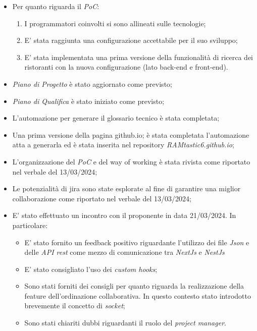 \begin{itemize}
    \item Per quanto riguarda il \emph{PoC}:
    \begin{enumerate}
        \item I programmatori coinvolti si sono allineati sulle tecnologie;
        \item E' stata raggiunta una configurazione accettabile per il suo sviluppo;
        \item E' stata implementata una prima versione della funzionalità di ricerca dei ristoranti con la nuova configurazione (lato back-end e front-end).
    \end{enumerate}
    \item \emph{Piano di Progetto} è stato aggiornato come previsto;
    \item \emph{Piano di Qualifica} è stato iniziato come previsto;
    \item L'automazione per generare il glossario tecnico è stata completata;
    \item Una prima versione della pagina github.io; è stata completata l'automazione atta a generarla ed è stata inserita nel repository \emph{RAMtastic6.github.io};
    \item L'organizzazione del \emph{PoC} e del way of working è stata rivista come riportato nel verbale del 13/03/2024;
    \item Le potenzialità di jira sono state esplorate al fine di garantire una miglior collaborazione come riportato nel verbale del 13/03/2024;
    \item E' stato effettuato un incontro con il proponente in data 21/03/2024. In particolare:
    \begin{itemize}
        \item E' stato fornito un feedback positivo riguardante l'utilizzo dei file \emph{Json} e delle \emph{API rest} come mezzo di comunicazione tra \emph{NextJs} e \emph{NestJs}
        \item E' stato consigliato l'uso dei \emph{custom hooks};
        \item Sono stati forniti dei consigli per quanto riguarda la realizzazione della feature dell'ordinazione collaborativa. In questo contesto stato introdotto brevemente il concetto di \emph{socket};
        \item Sono stati chiariti dubbi riguardanti il ruolo del \emph{project manager}.
    \end{itemize}
\end{itemize}
